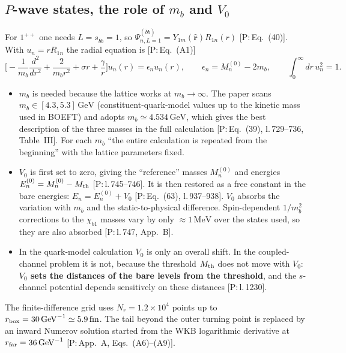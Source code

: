 \documentclass[11pt,a4paper]{article}
\newcommand{\tagP}[1]{\textcolor{blue!65!black}{\textsf{\small[P:\,#1]}}}
\newcommand{\Mth}{M_{\rm th}}
\renewcommand{\GeV}{\,\mathrm{GeV}}
\renewcommand{\MeV}{\,\mathrm{MeV}}
\newcommand{\fm}{\,\mathrm{fm}}
\begin{document}
\subsection{$P$-wave states, the role of $m_b$ and $V_0$}

For $1^{++}$ one needs $L=s_{\bar bb}=1$, so $\Psi^{(\bar bb)}_{n,L=1}=Y_{1m}(\hat{\bm r})R_{1n}(r)$ \tagP{Eq.~(40)}. With $u_n=rR_{1n}$ the radial equation is \tagP{Eq.~(A1)}
\begin{equation}
\Big[-\frac{1}{m_b}\frac{d^2}{dr^2}+\frac{2}{m_br^2}+\sigma r+\frac{\gamma}{r}\Big]u_n(r)=\epsilon_n u_n(r),\qquad \epsilon_n=M_n^{(0)}-2m_b,\qquad \int_0^\infty dr\,u_n^2=1 .
\end{equation}
\begin{itemize}
\item \textbf{$m_b$} is needed because the lattice works at $m_b\to\infty$. The paper scans $m_b\in[4.3,5.3]\GeV$ (constituent-quark-model values up to the kinetic mass used in BOEFT) and adopts $m_b\simeq4.534\GeV$, which gives the best description of the three masses in the full calculation \tagP{Eq.~(39), l.\,729--736, Table~III}. For each $m_b$ ``the entire calculation is repeated from the beginning'' with the lattice parameters fixed.
\item \textbf{$V_0$} is first set to zero, giving the ``reference'' masses $M_n^{(0)}$ and energies $E_n^{(0)}=M_n^{(0)}-\Mth$ \tagP{l.\,745--746}. It is then restored as a free constant in the bare energies: $E_n=E_n^{(0)}+V_0$ \tagP{Eq.~(63), l.\,937--938}. $V_0$ absorbs the variation with $m_b$ and the static-to-physical difference. Spin-dependent $1/m_b^2$ corrections to the $\chi_{b1}$ masses vary by only $\approx1\MeV$ over the states used, so they are also absorbed \tagP{l.\,747, App.~B}.
\item In the quark-model calculation $V_0$ is only an overall shift. In the coupled-channel problem it is not, because the threshold $\Mth$ does not move with $V_0$: \textbf{$V_0$ sets the distances of the bare levels from the threshold}, and the $s$-channel potential depends sensitively on these distances \tagP{l.\,1230}.
\end{itemize}

The finite-difference grid uses $N_r=1.2\times10^4$ points up to $r_{\rm box}=30\GeV^{-1}\simeq5.9\fm$. The tail beyond the outer turning point is replaced by an inward Numerov solution started from the WKB logarithmic derivative at $r_{\rm far}=36\GeV^{-1}$ \tagP{App.~A, Eqs.~(A6)--(A9)}.
\end{document}

